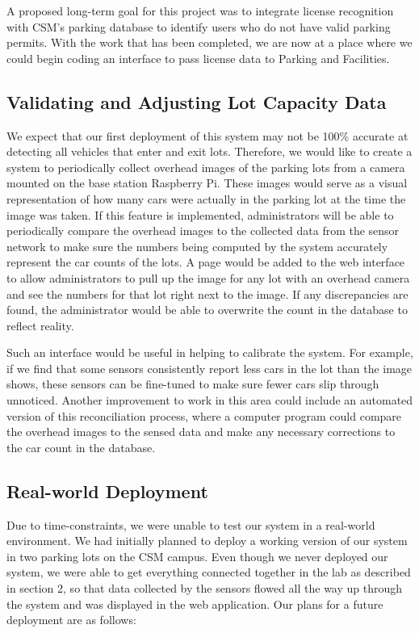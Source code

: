 \documentclass[11pt, oneside, fullpage, doublespace]{article}
\begin{document}
A proposed long-term goal for this project was to integrate license recognition with CSM's parking database to identify users who do not have valid parking permits. With the work that has been completed, we are now at a place where we could begin coding an interface to pass license data to Parking and Facilities.

\subsection{Validating and Adjusting Lot Capacity Data}
We expect that our first deployment of this system may not be 100\% accurate at detecting all vehicles that enter and exit lots. Therefore, we would like to create a system to periodically collect overhead images of the parking lots from a camera mounted on the base station Raspberry Pi. These images would serve as a visual representation of how many cars were actually in the parking lot at the time the image was taken. If this feature is implemented, administrators will be able to periodically compare the overhead images to the collected data from the sensor network to make sure the numbers being computed by the system accurately represent the car counts of the lots. A page would be added to the web interface to allow administrators to pull up the image for any lot with an overhead camera and see the numbers for that lot right next to the image. If any discrepancies are found, the administrator would be able to overwrite the count in the database to reflect reality.

Such an interface would be useful in helping to calibrate the system. For example, if we find that some sensors consistently report less cars in the lot than the image shows, these sensors can be fine-tuned to make sure fewer cars slip through unnoticed. Another improvement to work in this area could include an automated version of this reconciliation process, where a computer program could compare the overhead images to the sensed data and make any necessary corrections to the car count in the database.

\subsection{Real-world Deployment}
Due to time-constraints, we were unable to test our system in a real-world environment. We had initially planned to deploy a working version of our system in two parking lots on the CSM campus. Even though we never deployed our system, we were able to get everything connected together in the lab as described in section 2, so that data collected by the sensors flowed all the way up through the system and was displayed in the web application. Our plans for a future deployment are as follows:
\end{document}

